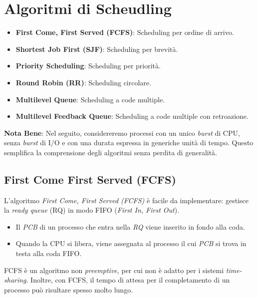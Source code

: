 \section{Algoritmi di Scheudling}
\begin{itemize}
    \item \textbf{First Come, First Served (FCFS)}: Scheduling per ordine di arrivo.
    \item \textbf{Shortest Job First (SJF)}: Scheduling per brevità.
    \item \textbf{Priority Scheduling}: Scheduling per priorità.
    \item \textbf{Round Robin (RR)}: Scheduling circolare.
    \item \textbf{Multilevel Queue}: Scheduling a code multiple.
    \item \textbf{Multilevel Feedback Queue}: Scheduling a code multiple con retroazione.
\end{itemize}

\noindent \textbf{Nota Bene}: Nel seguito, considereremo processi con un unico \textit{burst} di CPU, senza \textit{burst} di I/O e con una durata espressa in generiche unità di tempo. Questo semplifica la comprensione degli algoritmi senza perdita di generalità.

\subsection{First Come First Served (FCFS)}
L'algoritmo \textit{First Come, First Served (FCFS)} è facile da implementare: gestisce la \textit{ready queue} (RQ) in modo FIFO (\textit{First In, First Out}). 
\begin{itemize}
    \item Il \textit{PCB} di un processo che entra nella \textit{RQ} viene inserito in fondo alla coda.
    \item Quando la CPU si libera, viene assegnata al processo il cui \textit{PCB} si trova in testa alla coda FIFO.
\end{itemize}

\noindent FCFS è un algoritmo non \textit{preemptive}, per cui non è adatto per i sistemi \textit{time-sharing}. Inoltre, con FCFS, il tempo di attesa per il completamento di un processo può risultare spesso molto lungo.

